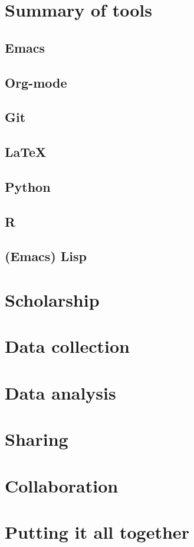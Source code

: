 \documentclass{book}
\begin{document}
\section{Summary of tools}
\label{sec-10-2}
\subsection{Emacs}
\label{sec-10-2-1}
\subsection{Org-mode}
\label{sec-10-2-2}
\subsection{Git}
\label{sec-10-2-3}
\subsection{\LaTeX{}}
\label{sec-10-2-4}
\subsection{Python}
\label{sec-10-2-5}
\subsection{R}
\label{sec-10-2-6}
\subsection{(Emacs) Lisp}
\label{sec-10-2-7}
\section{Scholarship}
\label{sec-10-3}
\section{Data collection}
\label{sec-10-4}
\section{Data analysis}
\label{sec-10-5}
\section{Sharing}
\label{sec-10-6}
\section{Collaboration}
\label{sec-10-7}
\section{Putting it all together}
\label{sec-10-8}


\printbibliography
\end{document}
